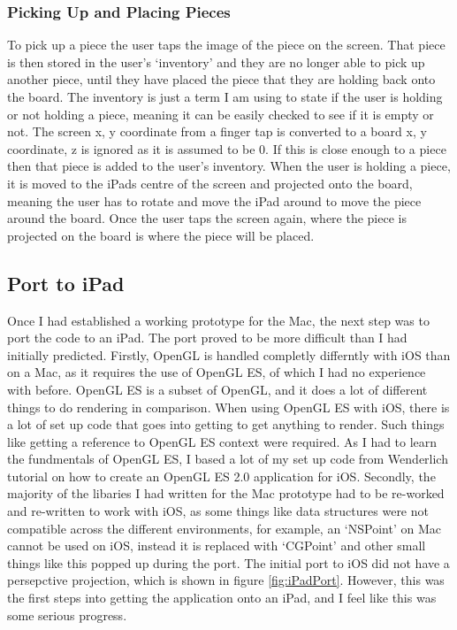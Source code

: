 \documentclass{article}
\begin{document}
\subsubsection{Picking Up and Placing Pieces}
To pick up a piece the user taps the image of the piece on the screen. That
piece is then stored in the user's `inventory' and they are no longer able to
pick up another piece, until they have placed the piece that they are holding
back onto the board. The inventory is just a term I am using to state if the
user is holding or not holding a piece, meaning it can be easily checked to see
if it is empty or not. The screen x, y coordinate from a finger tap is converted
to a board x, y coordinate, z is ignored as it is assumed to be 0. If this is
close enough to a piece then that piece is added to the user's inventory. When
the user is holding a piece, it is moved to the iPads centre of the screen and
projected onto the board, meaning the user has to rotate and move the iPad
around to move the piece around the board. Once the user taps the screen again,
where the piece is projected on the board is where the piece will be placed.

\subsection{Port to iPad}
Once I had established a working prototype for the Mac, the next step was to
port the code to an iPad. The port proved to be more difficult than I had
initially predicted. Firstly, OpenGL is handled completly differntly with iOS
than on a Mac, as it requires the use of OpenGL ES, of which I had no experience
with before. OpenGL ES is a subset of OpenGL, and it does a lot of different
things to do rendering in comparison. When using OpenGL ES with iOS, there is a
lot of set up code that goes into getting to get anything to render. Such things
like getting a reference to OpenGL ES context were required. As I had to learn
the fundmentals of OpenGL ES, I based a lot of my set up code from Wenderlich
tutorial \cite{ref:RayOpenGL} on how to create an OpenGL ES 2.0 application for
iOS. Secondly, the majority of the libaries I had written for the Mac prototype
had to be re-worked and re-written to work with iOS, as some things like data
structures were not compatible across the different environments, for example,
an `NSPoint' on Mac cannot be used on iOS, instead it is replaced with `CGPoint'
and other small things like this popped up during the port. The initial port to
iOS did not have a persepctive projection, which is shown in figure
\ref{fig:iPadPort}. However, this was the first steps into getting the
application onto an iPad, and I feel like this was some serious progress.
\end{document}
